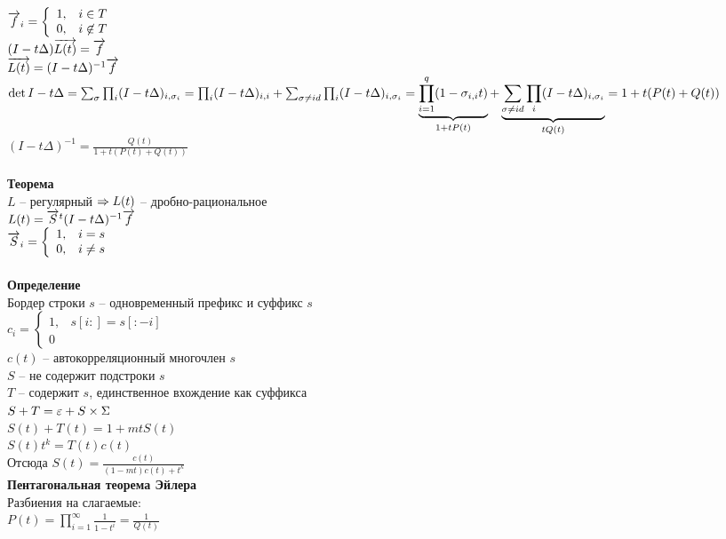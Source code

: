 \documentclass[12pt]{article}
\begin{document}
$\vect f_i = \left\{\begin{array}{cc}
    1,& i \in T\\
    0,& i \not \in T
\end{array}\right.$\\
$(I - t\Delta)\vect{L(t)} = \vect f$\\
$\vect{L(t)} = (I - t\Delta)^{-1} \vect f$\\
$\det I-t\Delta = \sum_\sigma \prod_i (I-t\Delta)_{i, \sigma_i} = \prod_i (I-t\Delta)_{i,i} + \sum_{\sigma \neq id} \prod_i (I-t\Delta)_{i, \sigma_i} = \ub{1+tP(t)}{\prod_{i=1}^q (1-\sigma_{i,i}t)} + \ub{tQ(t)}{\sum_{\sigma \neq id} \prod_i (I-t\Delta)_{i, \sigma_i}} = 1 + t(P(t) + Q(t))$\\
$(I - t\Delta)^{-1} = \frac{Q(t)}{1 + t(P(t)+Q(t))}$\\\\
\textbf{Теорема}\\
$L$ -- регулярный $\Rto L(t)$ -- дробно-рациональное\\
$L(t) = \vect{S}^t (I-t\Delta)^{-1}\vect f$\\
$\vect S_i = \left\{\begin{array}{cc}
    1,& i = s\\
    0,& i \neq s
\end{array}\right.$\\\\
\textbf{Определение}\\
Бордер строки $s$ -- одновременный префикс и суффикс $s$\\
$c_i = \left\{\begin{array}{cc}
    1,& s[i:]=s[:-i]\\
    0&
\end{array}\right.$\\
$c(t)$ -- автокорреляционный многочлен $s$\\
$S$ -- не содержит подстроки $s$\\
$T$ -- содержит $s$, единственное вхождение как суффикса\\
$S + T = \eps + S\times \Sigma$\\
$S(t) + T(t) = 1 + mtS(t)$\\
$S(t)t^k = T(t)c(t)$\\
Отсюда $S(t) = \frac{c(t)}{(1-mt)c(t)+t^k}$\\
\textbf{Пентагональная теорема Эйлера}\\
Разбиения на слагаемые:\\
$P(t) = \prod_{i=1}^\infty \frac1{1-t^i} = \frac{1}{Q(t)}$\\
\end{document}
